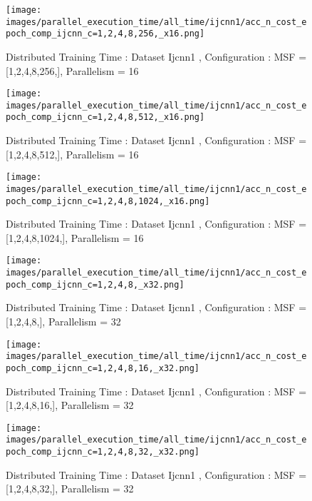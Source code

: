 \begin{figure*}[htbp]
\centering
\texttt{[image: images/parallel\_execution\_time/all\_time/ijcnn1/acc\_n\_cost\_epoch\_comp\_ijcnn\_c=1,2,4,8,256,\_x16.png]}
\caption{Distributed Training Time : Dataset Ijcnn1 , Configuration : MSF = [1,2,4,8,256,], Parallelism = 16}
\label{fig:dis-msf-tr-time-ijcnn1-x16}
\end{figure*}


\begin{figure*}[htbp]
\centering
\texttt{[image: images/parallel\_execution\_time/all\_time/ijcnn1/acc\_n\_cost\_epoch\_comp\_ijcnn\_c=1,2,4,8,512,\_x16.png]}
\caption{Distributed Training Time : Dataset Ijcnn1 , Configuration : MSF = [1,2,4,8,512,], Parallelism = 16}
\label{fig:dis-msf-tr-time-ijcnn1-x16}
\end{figure*}


\begin{figure*}[htbp]
\centering
\texttt{[image: images/parallel\_execution\_time/all\_time/ijcnn1/acc\_n\_cost\_epoch\_comp\_ijcnn\_c=1,2,4,8,1024,\_x16.png]}
\caption{Distributed Training Time : Dataset Ijcnn1 , Configuration : MSF = [1,2,4,8,1024,], Parallelism = 16}
\label{fig:dis-msf-tr-time-ijcnn1-x16}
\end{figure*}


\begin{figure*}[htbp]
\centering
\texttt{[image: images/parallel\_execution\_time/all\_time/ijcnn1/acc\_n\_cost\_epoch\_comp\_ijcnn\_c=1,2,4,8,\_x32.png]}
\caption{Distributed Training Time : Dataset Ijcnn1 , Configuration : MSF = [1,2,4,8,], Parallelism = 32}
\label{fig:dis-msf-tr-time-ijcnn1-x32}
\end{figure*}


\begin{figure*}[htbp]
\centering
\texttt{[image: images/parallel\_execution\_time/all\_time/ijcnn1/acc\_n\_cost\_epoch\_comp\_ijcnn\_c=1,2,4,8,16,\_x32.png]}
\caption{Distributed Training Time : Dataset Ijcnn1 , Configuration : MSF = [1,2,4,8,16,], Parallelism = 32}
\label{fig:dis-msf-tr-time-ijcnn1-x32}
\end{figure*}


\begin{figure*}[htbp]
\centering
\texttt{[image: images/parallel\_execution\_time/all\_time/ijcnn1/acc\_n\_cost\_epoch\_comp\_ijcnn\_c=1,2,4,8,32,\_x32.png]}
\caption{Distributed Training Time : Dataset Ijcnn1 , Configuration : MSF = [1,2,4,8,32,], Parallelism = 32}
\label{fig:dis-msf-tr-time-ijcnn1-x32}
\end{figure*}


